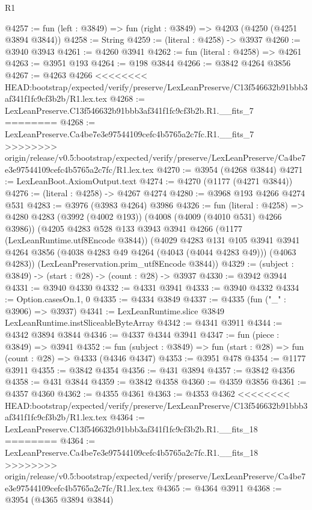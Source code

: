 \begin{lexlean}{R1}
\begin{coremodule}
{{{{{{{{{{{{{{{{{{{{{{{{{{{{{{{{{{{{{{{{{{{{{{{{{{{{{{{{{{{{{{{{{{{{{{{{{{{{{{{{{{{{{{{{{{{{{{{{{{{{{{{{{{{{{{{{{{{{{{{{{{{{{{{{{{{{{{{{{{{{{{{{{{{{{{{{{{{{{{{{{{{{{{{{{{{{{{{{{{{{{{{{{{@4257 := fun (left : @3849) => fun (right : @3849) => @4203 (@4250 (@4251 @3894 @3844))
@4258 := String
@4259 := (literal : @4258) -> @3937
@4260 := @3940 @3943
@4261 := @4260 @3941
@4262 := fun (literal : @4258) => @4261
@4263 := @3951 @193
@4264 := @198 @3844
@4266 := @3842 @4264 @3856
@4267 := @4263 @4266
<<<<<<<< HEAD:bootstrap/expected/verify/preserve/LexLeanPreserve/C13f546632b91bbb3af341f1fc9cf3b2b/R1.lex.tex
@4268 := LexLeanPreserve.C13f546632b91bbb3af341f1fc9cf3b2b.R1.__fits_7
========
@4268 := LexLeanPreserve.Ca4be7e3e97544109cefc4b5765a2c7fc.R1.__fits_7
>>>>>>>> origin/release/v0.5:bootstrap/expected/verify/preserve/LexLeanPreserve/Ca4be7e3e97544109cefc4b5765a2c7fc/R1.lex.tex
@4270 := @3954 (@4268 @3844)
@4271 := LexLeanBoot.AxiomOutput.text
@4274 := @4270 (@1177 (@4271 @3844))
@4276 := (literal : @4258) -> @4267 @4274
@4280 := @3968 @193 @4266 @4274 @531
@4283 := @3976 (@3983 @4264) @3986
@4326 := fun (literal : @4258) =>
  @4280
    @4283
    (@3992 (@4002 @193))
    (@4008 (@4009 (@4010 @531) @4266 @3986))
    (@4205
      @4283
      @528
      @133
      @3943
      @3941
      @4266
      (@1177 (LexLeanRuntime.utf8Encode @3844))
      (@4029
        @4283
        @131
        @105
        @3941
        @3941
        @4264
        @3856
        (@4038 @4283 @49 @4264 (@4043 (@4044 @4283 @49)))
        (@4063 @4283))
      (LexLeanPreservation.prim_utf8Encode @3844))
@4329 := (subject : @3849) -> (start : @28) -> (count : @28) -> @3937
@4330 := @3942 @3944
@4331 := @3940 @4330
@4332 := @4331 @3941
@4333 := @3940 @4332
@4334 := Option.casesOn.{1, 0}
@4335 := @4334 @3849
@4337 := @4335 (fun ("_" : @3906) => @3937)
@4341 := LexLeanRuntime.slice @3849 LexLeanRuntime.instSliceableByteArray
@4342 := @4341 @3911
@4344 := @4342 @3894 @3844
@4346 := @4337 @4344 @3941
@4347 := fun (piece : @3849) => @3941
@4352 := fun (subject : @3849) => fun (start : @28) => fun (count : @28) => @4333 (@4346 @4347)
@4353 := @3951 @478
@4354 := @1177 @3911
@4355 := @3842 @4354
@4356 := @431 @3894
@4357 := @3842 @4356
@4358 := @431 @3844
@4359 := @3842 @4358
@4360 := @4359 @3856
@4361 := @4357 @4360
@4362 := @4355 @4361
@4363 := @4353 @4362
<<<<<<<< HEAD:bootstrap/expected/verify/preserve/LexLeanPreserve/C13f546632b91bbb3af341f1fc9cf3b2b/R1.lex.tex
@4364 := LexLeanPreserve.C13f546632b91bbb3af341f1fc9cf3b2b.R1.__fits_18
========
@4364 := LexLeanPreserve.Ca4be7e3e97544109cefc4b5765a2c7fc.R1.__fits_18
>>>>>>>> origin/release/v0.5:bootstrap/expected/verify/preserve/LexLeanPreserve/Ca4be7e3e97544109cefc4b5765a2c7fc/R1.lex.tex
@4365 := @4364 @3911
@4368 := @3954 (@4365 @3894 @3844)
}}}}}}}}}}}}}}}}}}}}}}}}}}}}}}}}}}}}}}}}}}}}}}}}}}}}}}}}}}}}}}}}}}}}}}}}}}}}}}}}}}}}}}}}}}}}}}}}}}}}}}}}}}}}}}}}}}}}}}}}}}}}}}}}}}}}}}}}}}}}}}}}}}}}}}}}}}}}}}}}}}}}}}}}}}}}}}}}}}}}}}}}}}
\end{coremodule}
\end{lexlean}
